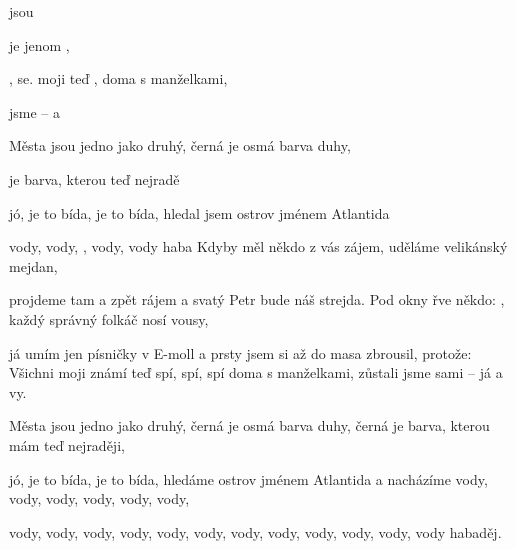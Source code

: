 
\zs
{} jsou   

 je  jenom ,

 

,   se.
\ks
\zr
{} moji  teď ,  
 doma s manželkami,

 jsme  –  a 

Města jsou jedno jako druhý, černá je osmá barva duhy,

 je barva, kterou  teď nejradě

jó, je to bída, je to bída, hledal jsem ostrov jménem Atlantida

 vody, vody, , vody, vody haba
\kr
\zs
Kdyby měl někdo z vás zájem,
uděláme velikánský mejdan,

projdeme tam a zpět rájem
a svatý Petr bude náš strejda.
\ks
\zr      \kr
\zs
Pod okny řve někdo: ,
každý správný folkáč nosí vousy,

já umím jen písničky v E-moll
a prsty jsem si až do masa zbrousil, protože:
\ks
\zr
Všichni moji známí teď spí, spí, spí doma s manželkami,
zůstali jsme sami -- já a vy.

Města jsou jedno jako druhý, černá je osmá barva duhy,
černá je barva, kterou mám teď nejraději,

jó, je to bída, je to bída, hledáme ostrov jménem Atlantida
a nacházíme vody, vody, vody, vody, vody, vody,

vody, vody, vody, vody, vody, vody,
vody, vody, vody, vody, vody, vody habaděj.
\kr
\kp







